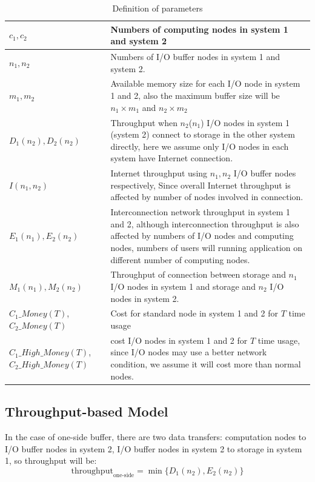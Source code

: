 \documentclass[JIP,draft]{ipsj}
\begin{document}
\begin{table}[tb]
	\caption{Definition of parameters}
	\label{definition}
\begin{tabular}{|p{3cm}|p{5cm}|}
	\hline
	$c_1,c_2$&Numbers of computing nodes in system 1 and system 2\\\hline
	$n_1, n_2$&Numbers of I/O buffer nodes in system 1 and system 2.\\\hline
	$m_1,m_2$&Available memory size for each I/O node in system 1 and 2, also the maximum buffer size will be $n_1\times m_1$ and $n_2\times m_2$\\\hline
	$D_1(n_2),D_2(n_2)$&Throughput when $n_2$($n_1$) I/O nodes in system 1 (system 2) connect to storage in the other system directly, here we assume only I/O nodes in each system have Internet connection.\\\hline
	$I(n_1,n_2)$& 	Internet throughput using $n_1,n_2$ I/O buffer nodes respectively, Since overall Internet throughput is affected by number of nodes involved in connection.\\\hline
	$E_1(n_1), E_2(n_2)$&Interconnection network throughput in system 1 and 2, although interconnection throughput is also affected by numbers of I/O nodes and computing nodes, numbers of users will running application on different number of computing nodes.\\\hline
	$M_1(n_1),M_2(n_2)$& Throughput of connection between storage and $n_1$ I/O nodes in system 1 and storage and $n_2$ I/O nodes in system 2.\\\hline
	$C_1\_Money(T)$,$C_2\_Money(T)$& Cost for standard node in system 1 and 2 for $T$ time usage\\\hline
	$C_1\_High\_Money(T)$,$C_2\_High\_Money(T)$& cost I/O nodes in system 1 and 2 for $T$ time usage, since I/O nodes may use a better network condition, we assume it will cost more than normal nodes.\\\hline
\end{tabular}
\end{table}

\subsection{Throughput-based Model}
In the case of one-side buffer, there are two data transfers: computation nodes to I/O buffer nodes in system 2, I/O buffer nodes in system 2 to storage in system 1, so throughput will be:
\begin{equation}
	\text{throughput}_{\text{one-side}}=\min\{D_1(n_2),E_2(n_2)\} \label{throughput1}
\end{equation}
\end{document}
